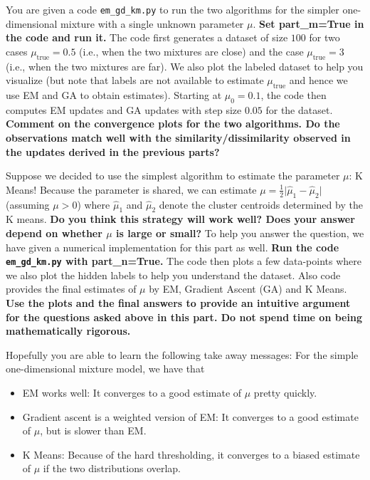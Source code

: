 \documentclass[preview]{standalone}
\begin{document}
\begin{Parts}
You are given a code {\tt{em\_gd\_km.py}} to run the two algorithms for the simpler one-dimensional
mixture with a single unknown parameter $\mu$.
{\bf Set part\_m=True in the code and run it.}
The code first generates a dataset of size $100$ for two cases $\mu_{\text{true}} = 0.5$ (i.e., when the 
two mixtures are close) and the case $\mu_{\text{true}} = 3$ (i.e.,
when the two mixtures are far).
We also plot the labeled dataset to help you visualize (but note that labels are not 
available to estimate $\mu_{\text{true}}$ and hence we use EM and GA to obtain estimates).
Starting at $\mu_0=0.1$, the code then computes EM updates and GA updates with step size $0.05$ for the dataset.
{\bf Comment on the convergence plots for the two algorithms. Do the observations match well with
the similarity/dissimilarity observed in the updates derived in the previous parts?}

\Part Suppose we decided to use the simplest algorithm to estimate the parameter $\mu$: K Means! 
Because the parameter is shared, we can estimate $\mu = \frac{1}{2}\vert \hat\mu_1 - \hat\mu_2\vert$ (assuming $\mu>0$)
where $\hat\mu_1$ and $\hat\mu_2$ denote the cluster centroids determined by the K means.
{\bf Do you think this strategy will work well?
Does your answer depend on whether $\mu$ is large or small?}
To help you answer the question, we have given a numerical implementation for this part as well.
{\bf Run the code {\tt{em\_gd\_km.py}} with part\_n=True.}
The code then plots a few data-points where we also plot the hidden labels to help you understand the dataset.
Also code provides the final estimates of $\mu$ by EM, Gradient Ascent (GA) and K Means.
{\bf Use the plots and the final answers to provide an intuitive argument for the questions asked above in this part.
Do not spend time on being mathematically rigorous.}

Hopefully you are able to learn the following take away messages: For the simple one-dimensional
mixture model, we have that
\begin{itemize}
  \item EM works well: It converges to a good estimate of $\mu$ pretty quickly.
  \item Gradient ascent is a weighted version of EM: It converges to a
    good estimate of $\mu$, but is slower than EM.
  \item K Means: Because of the hard thresholding, it converges to a biased estimate of $\mu$ if the two distributions overlap.
\end{itemize}

\end{Parts}
\end{document}
